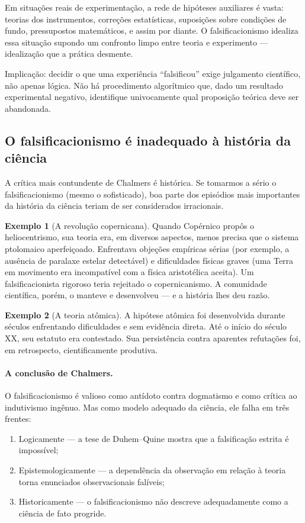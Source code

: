 \documentclass[9pt,a4paper]{extarticle}
\newcommand{\impt}[1]{\textcolor{important}{#1}}
\newcommand{\ntc}[1]{\textcolor{notice}{#1}}
\theoremstyle{definition}
\newtheorem{example}{Exemplo}[section]
\begin{document}
Em situações reais de experimentação, a rede de hipóteses auxiliares é vasta: teorias dos instrumentos, correções estatísticas, suposições sobre condições de fundo, pressupostos matemáticos, e assim por diante. O falsificacionismo idealiza essa situação supondo um confronto limpo entre teoria e experimento --- idealização que a prática desmente.

\ntc{Implicação:} decidir o que uma experiência ``falsificou'' exige \impt{julgamento científico}, não apenas lógica. Não há procedimento algorítmico que, dado um resultado experimental negativo, identifique univocamente qual proposição teórica deve ser abandonada.

\subsection{O falsificacionismo é inadequado à história da ciência}

A crítica mais contundente de Chalmers é \impt{histórica}. Se tomarmos a sério o falsificacionismo (mesmo o sofisticado), boa parte dos episódios mais importantes da história da ciência teriam de ser considerados irracionais.

\begin{example}[A revolução copernicana]
Quando Copérnico propôs o heliocentrismo, sua teoria era, em diversos aspectos, \impt{menos precisa} que o sistema ptolomaico aperfeiçoado. Enfrentava objeções empíricas sérias (por exemplo, a ausência de paralaxe estelar detectável) e dificuldades físicas graves (uma Terra em movimento era incompatível com a física aristotélica aceita). Um falsificacionista rigoroso teria rejeitado o copernicanismo. A comunidade científica, porém, o manteve e desenvolveu --- e a história lhes deu razão.
\end{example}

\begin{example}[A teoria atômica]
A hipótese atômica foi desenvolvida durante séculos enfrentando dificuldades e sem evidência direta. Até o início do século XX, seu estatuto era contestado. Sua persistência contra aparentes refutações foi, em retrospecto, cientificamente produtiva.
\end{example}

\paragraph{A conclusão de Chalmers.}
O falsificacionismo é valioso como \impt{antídoto contra dogmatismo} e como crítica ao indutivismo ingênuo. Mas como modelo adequado da ciência, ele falha em três frentes:
\begin{enumerate}
  \item \impt{Logicamente} --- a tese de Duhem--Quine mostra que a falsificação estrita é impossível;
  \item \impt{Epistemologicamente} --- a dependência da observação em relação à teoria torna enunciados observacionais falíveis;
  \item \impt{Historicamente} --- o falsificacionismo não descreve adequadamente como a ciência de fato progride.
\end{enumerate}
\end{document}
